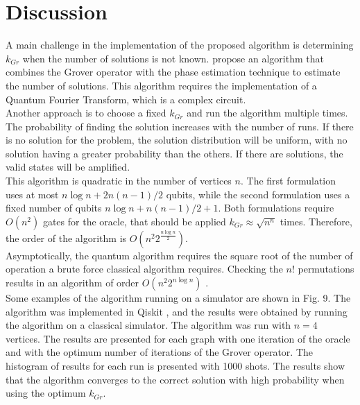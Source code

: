 \documentclass[10pt,a4paper]{article}
\begin{document}
\section{Discussion}
A main challenge in the implementation of the proposed algorithm is determining $k_{Gr}$ when the number of solutions is not known. \cite{Nielsen_Chuang_2010} propose an algorithm that combines the Grover operator with the phase estimation technique to estimate the number of solutions. This algorithm requires the implementation of a Quantum Fourier Transform, which is a complex circuit.\\
Another approach is to choose a fixed $k_{Gr}$ and run the algorithm multiple times. The probability of finding the solution increases with the number of runs. If there is no solution for the problem, the solution distribution will be uniform, with no solution having a greater probability than the others. If there are solutions, the valid states will be amplified.\\
This algorithm is quadratic in the number of vertices $n$. The first formulation uses at most $n\log{n} + 2 n(n-1)/2$ qubits, while the second formulation uses a fixed number of qubits $n \log{n} + n(n-1)/2 + 1$. Both formulations require $O(n^2)$ gates for the oracle, that should be applied $k_{Gr}\approx \sqrt{n^n}$ times. Therefore, the order of the algorithm is $O(n^2 2^{\frac{n \log n}{2}})$.\\
Asymptotically, the quantum algorithm requires the square root of the number of operation a brute force classical algorithm requires. Checking the $n!$ permutations results in an algorithm of order $O(n^2 2^{n \log n})$ \cite{quantum_hamiltonian}.\\
Some examples of the algorithm running on a simulator are shown in Fig. 9. The algorithm was implemented in Qiskit \cite{Qiskit}, and the results were obtained by running the algorithm on a classical simulator. The algorithm was run with $n = 4$ vertices.
The results are presented for each graph with one iteration of the oracle and with the optimum number of iterations of the Grover operator. The histogram of results for each run is presented with 1000 shots. The results show that the algorithm converges to the correct solution with high probability when using the optimum $k_{Gr}$.\\ 
\end{document}
